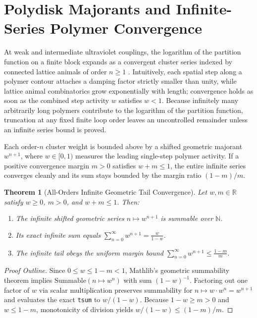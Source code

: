 \documentclass[11pt,a4paper]{article}
\newtheorem{theorem}{Theorem}[section]
\newcommand{\R}{\mathbb{R}}
\begin{document}
\section{Polydisk Majorants and Infinite-Series Polymer Convergence}
At weak and intermediate ultraviolet couplings, the logarithm of the partition function on a finite block expands as a convergent cluster series indexed by connected lattice animals of order $n \ge 1$ \cite{KoteckyPreiss1986,Seiler1982}. Intuitively, each spatial step along a polymer contour attaches a damping factor strictly smaller than unity, while lattice animal combinatorics grow exponentially with length; convergence holds as soon as the combined step activity $w$ satisfies $w < 1$. Because infinitely many arbitrarily long polymers contribute to the logarithm of the partition function, truncation at any fixed finite loop order leaves an uncontrolled remainder unless an infinite series bound is proved.

Each order-$n$ cluster weight is bounded above by a shifted geometric majorant $w^{n+1}$, where $w \in [0, 1)$ measures the leading single-step polymer activity. If a positive convergence margin $m > 0$ satisfies $w + m \le 1$, the entire infinite series converges cleanly and its sum stays bounded by the margin ratio $(1 - m) / m$.

\begin{theorem}[All-Orders Infinite Geometric Tail Convergence]
Let $w, m \in \R$ satisfy $w \ge 0$, $m > 0$, and $w + m \le 1$. Then:
\begin{enumerate}
\item The infinite shifted geometric series $n \mapsto w^{n+1}$ is summable over $\mathbb{N}$.
\item Its exact infinite sum equals $\sum_{n=0}^{\infty} w^{n+1} = \frac{w}{1 - w}$.
\item The infinite tail obeys the uniform margin bound $\sum_{n=0}^{\infty} w^{n+1} \le \frac{1 - m}{m}$.
\end{enumerate}
\end{theorem}

\begin{proof}[Proof Outline]
Since $0 \le w \le 1 - m < 1$, Mathlib's geometric summability theorem implies $\mathrm{Summable}(n \mapsto w^n)$ with sum $(1 - w)^{-1}$. Factoring out one factor of $w$ via scalar multiplication preserves summability for $n \mapsto w \cdot w^n = w^{n+1}$ and evaluates the exact \texttt{tsum} to $w / (1 - w)$. Because $1 - w \ge m > 0$ and $w \le 1 - m$, monotonicity of division yields $w / (1 - w) \le (1 - m) / m$.
\end{proof}
\end{document}
